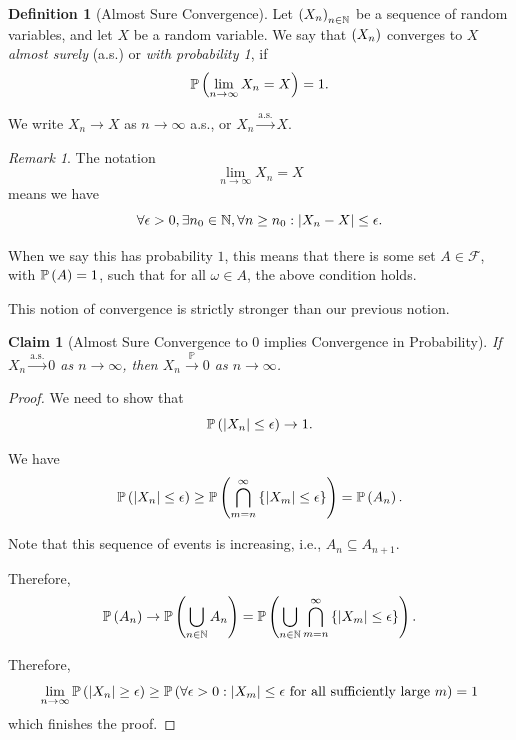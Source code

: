 \documentclass{article}
\newtheorem{claim}[theorem]{Claim}
\theoremstyle{definition}
\newtheorem{definition}[theorem]{Definition}
\theoremstyle{remark}
\newtheorem{remark}[theorem]{Remark}
\DeclarePairedDelimiter{\abs}{\lvert}{\rvert}
\newcommand{\NN}{\mathbb{N}}
\newcommand{\Prob}{\mathbb{P}}
\newcommand{\eventSpace}{\mathcal{F}}
\newcommand{\toProb}{\xrightarrow{\mathbb P}}
\newcommand{\toAlmostSure}{\xrightarrow{\mathrm{a.s.}}}
\begin{document}
\begin{definition}[Almost Sure Convergence]
    \label{def:almost-sure-convergence}%
    Let \(\pqty{X_n}_{n \in \NN}\) be a sequence of random variables, and let \(X\) be a random variable. We say that \(\left(X_n\right)\) converges to \(X\) \emph{almost surely} (a.s.) or \emph{with probability 1}, if
    \[
        \Prob\pqty{\lim_{n \to \infty} X_n = X} = 1.
    \]

    We write \(X_n \to X\) as \(n \to \infty\) a.s., or \(X_n \toAlmostSure X\).
\end{definition}

\begin{remark}
    The notation
    \[
        \lim_{n \to \infty} X_n = X
    \]
    means we have
    \[
        \forall \epsilon > 0, \exists n_0 \in \NN, \forall n \geq n_0: \abs{X_n - X} \leq \epsilon.
    \]

    When we say this has probability \(1\), this means that there is some set \(A \in \eventSpace\), with \(\Prob\pqty{A} = 1\), such that for all \(\omega \in A\), the above condition holds.
\end{remark}

This notion of convergence is strictly stronger than our previous notion.

\begin{claim}[Almost Sure Convergence to \(0\) implies Convergence in Probability]
    \label{claim:almost-sure-convergence-implies-convergence-in-probability}%
    If \(X_n \toAlmostSure 0\) as \(n \to \infty\), then \(X_n \toProb 0\) as \(n \to \infty\).
\end{claim}

\begin{proof}
    We need to show that
    \[
        \Prob\pqty{\abs{X_n} \leq \epsilon} \to 1.
    \]

    We have
    \[
        \Prob\pqty{\abs{X_n} \leq \epsilon} \geq \Prob\pqty{\bigcap_{m = n}^{\infty} \Bqty{\abs{X_m} \leq \epsilon}} = \Prob\pqty{A_n}.
    \]

    Note that this sequence of events is increasing, i.e., \(A_n \subseteq A_{n + 1}\).

    Therefore,
    \[
        \Prob\pqty{A_n} \to \Prob\pqty{\bigcup_{n \in \NN} A_n} = \Prob\pqty{\bigcup_{n \in \NN} \bigcap_{m = n}^{\infty} \Bqty{\abs{X_m} \leq \epsilon}}.
    \]  

    Therefore,
    \[
        \lim_{n \to \infty} \Prob\pqty{\abs{X_n} \geq \epsilon} \geq \Prob\pqty{\forall \epsilon > 0: \abs{X_m} \leq \epsilon \text{ for all sufficiently large }m} = 1
    \]
    which finishes the proof.
\end{proof}
\end{document}
